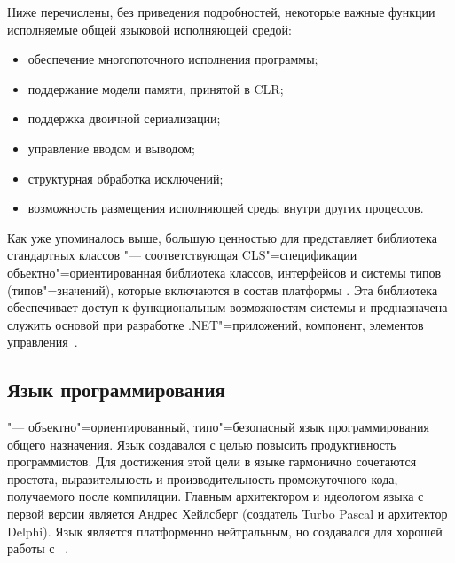 Ниже перечислены, без приведения подробностей, некоторые важные функции исполняемые общей языковой исполняющей средой:
\begin{itemize}
  \item обеспечение многопоточного исполнения программы;
  \item поддержание модели памяти, принятой в CLR;
  \item поддержка двоичной сериализации;
  \item управление вводом и выводом;
  \item структурная обработка исключений;
  \item возможность размещения исполняющей среды внутри других процессов.
\end{itemize}

Как уже упоминалось выше, большую ценностью для \dotnet{} представляет библиотека стандартных классов "--- соответствующая CLS"=спецификации объектно"=ориентированная библиотека классов, интерфейсов и системы типов (типов"=значений), которые включаются в состав платформы \dotnet{}.
Эта библиотека обеспечивает доступ к функциональным возможностям системы и предназначена служить основой при разработке .NET"=приложений, компонент, элементов управления~\cite{marchenko_2007}.



\subsection{Язык программирования \csharp{}}
\label{sub:practice:csharp_overview}
\csharp{} "--- объектно"=ориентированный, типо"=безопасный язык программирования общего назначения.
Язык создавался с целью повысить продуктивность программистов.
Для достижения этой цели в языке гармонично сочетаются простота, выразительность и производительность промежуточного кода, получаемого после компиляции.
Главным архитектором и идеологом языка с первой версии является Андрес Хейлсберг (создатель Turbo Pascal и архитектор Delphi).
Язык \csharp{} является платформенно нейтральным, но создавался для хорошей работы с \dotnet{}~\cite{albahari_2012_en}.

